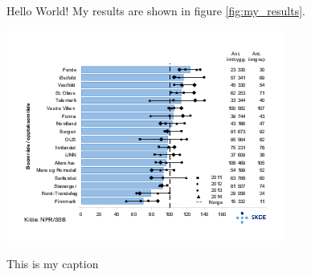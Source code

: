 \documentclass{article}
\begin{document}
Hello World!
My results are shown in figure \ref{fig:my_results}.

\begin{table}[h]
\includegraphics{fig.png}
\caption{This is my caption}\label{fig:my_results}
\end{table}
\end{document}
